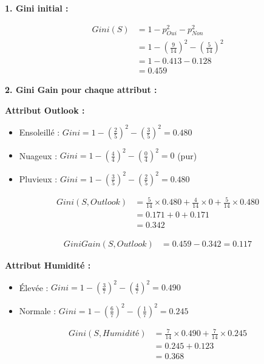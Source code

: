 \documentclass[11pt,a4paper]{article}
\begin{document}
\begin{solutionbox}
\textbf{1. Gini initial :}

\begin{align*}
Gini(S) &= 1 - p_{Oui}^2 - p_{Non}^2 \\
        &= 1 - \left(\frac{9}{14}\right)^2 - \left(\frac{5}{14}\right)^2 \\
        &= 1 - 0.413 - 0.128 \\
        &= 0.459
\end{align*}

\textbf{2. Gini Gain pour chaque attribut :}

\textbf{Attribut Outlook :}
\begin{itemize}
    \item Ensoleillé : $Gini = 1 - \left(\frac{2}{5}\right)^2 - \left(\frac{3}{5}\right)^2 = 0.480$
    \item Nuageux : $Gini = 1 - \left(\frac{4}{4}\right)^2 - \left(\frac{0}{4}\right)^2 = 0$ (pur)
    \item Pluvieux : $Gini = 1 - \left(\frac{3}{5}\right)^2 - \left(\frac{2}{5}\right)^2 = 0.480$
\end{itemize}

\begin{align*}
Gini(S, Outlook) &= \frac{5}{14} \times 0.480 + \frac{4}{14} \times 0 + \frac{5}{14} \times 0.480 \\
                  &= 0.171 + 0 + 0.171 \\
                  &= 0.342
\end{align*}

\begin{align*}
GiniGain(S, Outlook) &= 0.459 - 0.342 = 0.117
\end{align*}

\textbf{Attribut Humidité :}
\begin{itemize}
    \item Élevée : $Gini = 1 - \left(\frac{3}{7}\right)^2 - \left(\frac{4}{7}\right)^2 = 0.490$
    \item Normale : $Gini = 1 - \left(\frac{6}{7}\right)^2 - \left(\frac{1}{7}\right)^2 = 0.245$
\end{itemize}

\begin{align*}
Gini(S, Humidité) &= \frac{7}{14} \times 0.490 + \frac{7}{14} \times 0.245 \\
                  &= 0.245 + 0.123 \\
                  &= 0.368
\end{align*}


\end{solutionbox}
\end{document}
